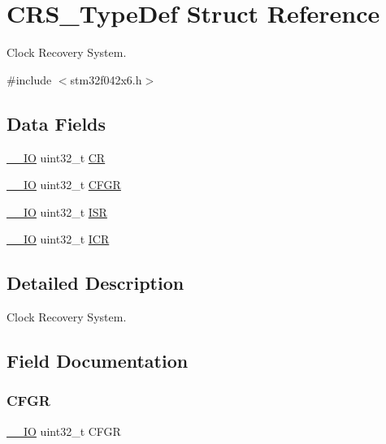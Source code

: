 \hypertarget{struct_c_r_s___type_def}{}\section{C\+R\+S\+\_\+\+Type\+Def Struct Reference}
\label{struct_c_r_s___type_def}


Clock Recovery System.  




{\ttfamily \#include $<$stm32f042x6.\+h$>$}

\subsection*{Data Fields}
\begin{DoxyCompactItemize}
\item 
\hyperlink{core__sc300_8h_aec43007d9998a0a0e01faede4133d6be}{\+\_\+\+\_\+\+IO} uint32\+\_\+t \hyperlink{struct_c_r_s___type_def_ab40c89c59391aaa9d9a8ec011dd0907a}{CR}
\item 
\hyperlink{core__sc300_8h_aec43007d9998a0a0e01faede4133d6be}{\+\_\+\+\_\+\+IO} uint32\+\_\+t \hyperlink{struct_c_r_s___type_def_a26f1e746ccbf9c9f67e7c60e61085ec1}{C\+F\+GR}
\item 
\hyperlink{core__sc300_8h_aec43007d9998a0a0e01faede4133d6be}{\+\_\+\+\_\+\+IO} uint32\+\_\+t \hyperlink{struct_c_r_s___type_def_ab3c49a96815fcbee63d95e1e74f20e75}{I\+SR}
\item 
\hyperlink{core__sc300_8h_aec43007d9998a0a0e01faede4133d6be}{\+\_\+\+\_\+\+IO} uint32\+\_\+t \hyperlink{struct_c_r_s___type_def_a0a8c8230846fd8ff154b9fde8dfa0399}{I\+CR}
\end{DoxyCompactItemize}


\subsection{Detailed Description}
Clock Recovery System. 

\subsection{Field Documentation}
\mbox{\label{struct_c_r_s___type_def_a26f1e746ccbf9c9f67e7c60e61085ec1}} 
\subsubsection{\texorpdfstring{C\+F\+GR}{CFGR}}
{\footnotesize\ttfamily \hyperlink{core__sc300_8h_aec43007d9998a0a0e01faede4133d6be}{\+\_\+\+\_\+\+IO} uint32\+\_\+t C\+F\+GR}

